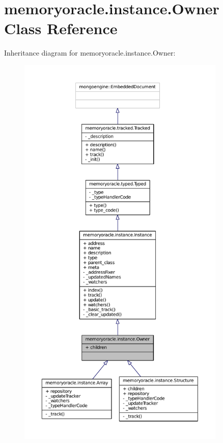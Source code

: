 \hypertarget{classmemoryoracle_1_1instance_1_1Owner}{}\section{memoryoracle.\+instance.\+Owner Class Reference}
\label{classmemoryoracle_1_1instance_1_1Owner}


Inheritance diagram for memoryoracle.\+instance.\+Owner\+:\nopagebreak
\begin{figure}[H]
\begin{center}
\leavevmode
\includegraphics[height=550pt]{classmemoryoracle_1_1instance_1_1Owner__inherit__graph}
\end{center}
\end{figure}



